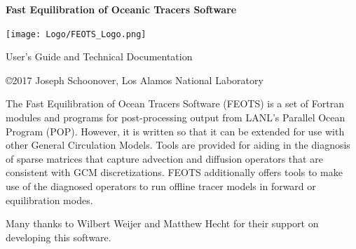 \documentclass{softwaremanual}
\author{Joseph Schoonover, Jiaxu Zhang, Wilbert Weijer}
\date{}
\begin{document}
\frontmatter
\begin{titlingpage}
    
        \vspace*{2cm}


   {\selectfont
   \begin{center}
     \Large{\textbf{ Fast Equilibration of Oceanic Tracers Software  }}\\
   \end{center}
    } 
\hspace{3.2385cm} \texttt{[image: Logo/FEOTS\_Logo.png]}

      
        
        \vspace{2cm}
        
     \begin{center}
     
        { \selectfont
          \large{ User's Guide and Technical Documentation }\\
          \vspace{1.5cm}
          \textbf{\large{\theauthor}}
          
        }
        
        \vspace{8cm}
        
        \copyright 2017 Joseph Schoonover, Los Alamos National Laboratory
     \end{center}
        
    
\end{titlingpage}

The Fast Equilibration of Ocean Tracers Software (FEOTS) is a set of Fortran modules and programs for post-processing output from LANL's Parallel Ocean Program (POP). However, it is written so that it can be extended for use with other General Circulation Models. Tools are provided for aiding in the diagnosis of sparse matrices that capture advection and diffusion operators that are consistent with GCM discretizations. FEOTS additionally offers tools to make use of the diagnosed operators to run offline tracer models in forward or equilibration modes.


 Many thanks to Wilbert Weijer and Matthew Hecht for their support on developing this software.
  
\end{document}
